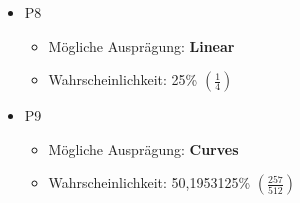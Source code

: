 \begin{NFT-Prop}
\begin{itemize}
    \begin{itemize}
    	\item Mögliche Ausprägung: \textbf{Zigzag} 
    		\item Wahrscheinlichkeit: 12,5\% $\left( \frac{1}{8} \right)$
    \end{itemize}
    \item P8
    \begin{itemize}
    	\item Mögliche Ausprägung: \textbf{Linear}  
    	\item Wahrscheinlichkeit: 25\% $\left( \frac{1}{4} \right)$
    \end{itemize}
    \item P9
    \begin{itemize}
    	\item Mögliche Ausprägung: \textbf{Curves}
    	\item Wahrscheinlichkeit: 50,1953125\% $\left( \frac{257}{512} \right)$
    \end{itemize}
\end{itemize}

\end{NFT-Prop}

\vspace{0.3cm}

